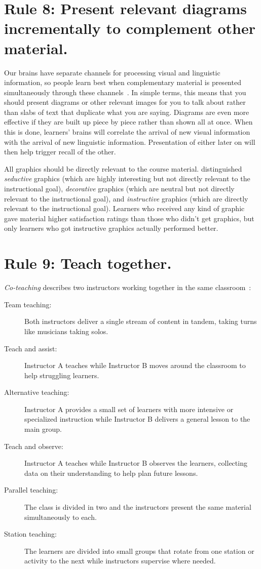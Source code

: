 \documentclass[10pt,letterpaper]{article}
\newcommand{\rulemajor}[1]{\section{#1}}
\begin{document}
\rulemajor{Rule 8: Present relevant diagrams incrementally to complement other material.}

Our brains have separate channels for
processing visual and linguistic information,
so people learn best when complementary material is presented simultaneously through these channels~\cite{Maye2003,Maye2009}.
In simple terms,
this means that you should present diagrams or other relevant images for you to talk about
rather than slabs of text that duplicate what you are saying.
Diagrams are even more effective if they are built up piece by piece rather than shown all at once.
When this is done,
learners' brains will correlate the arrival of new visual information
with the arrival of new linguistic information.
Presentation of either later on will then help trigger recall of the other.

All graphics should be directly relevant to the course material.
\cite{Sung2012} distinguished \emph{seductive} graphics
(which are highly interesting but not directly relevant to the instructional goal),
\emph{decorative} graphics
(which are neutral but not directly relevant to the instructional goal),
and \emph{instructive} graphics
(which are directly relevant to the instructional goal).
Learners who received any kind of graphic gave material higher satisfaction ratings
than those who didn't get graphics,
but only learners who got instructive graphics actually performed better.

\rulemajor{Rule 9: Teach together.}

\emph{Co-teaching} describes two instructors working together in the same classroom~\cite{Frie2016}:

\begin{description}

\item[Team teaching:]
  Both instructors deliver a single stream of content in tandem,
  taking turns like musicians taking solos.

\item[Teach and assist:]
  Instructor A teaches while Instructor B moves around the classroom
  to help struggling learners.

\item[Alternative teaching:]
  Instructor A provides a small set of learners with more intensive or specialized instruction
  while Instructor B delivers a general lesson to the main group.

\item[Teach and observe:]
  Instructor A teaches while Instructor B observes the learners,
  collecting data on their understanding to help plan future lessons.

\item[Parallel teaching:]
  The class is divided in two
  and the instructors present the same material simultaneously to each.

\item[Station teaching:]
  The learners are divided into small groups
  that rotate from one station or activity to the next
  while instructors supervise where needed.

\end{description}
\end{document}
